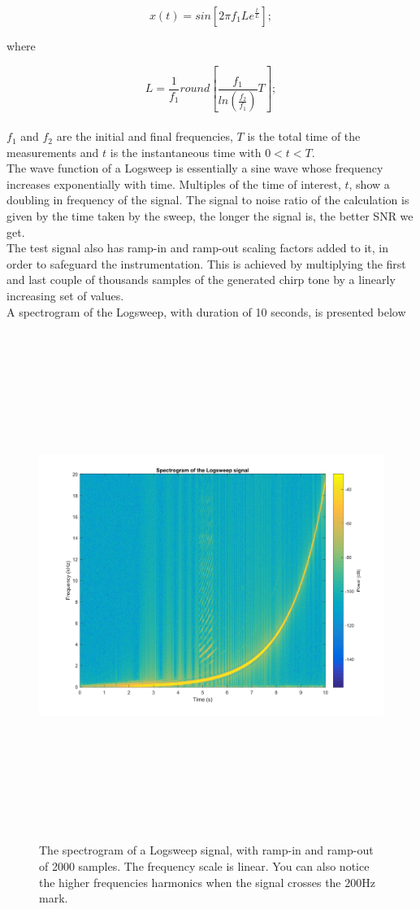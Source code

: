 \begin{equation}
x(t) = sin \left[ 2 \pi f_1 L e^{\frac{t}{L}} \right];
\label{eqn:logsweep}
\end{equation}

where

\[ L = \frac{1}{f_1} round \left[ \frac{f_1}{ln(\frac{f_2}{f_1})} T \right]; \]
\\
$f_1$ and $f_2$ are the initial and final frequencies, $T$ is the total time of the measurements and $t$ is the instantaneous time with $0<t<T$.
\\
The wave function of a Logsweep is essentially a sine wave whose frequency increases exponentially with time. Multiples of the time of interest, $t$, show a doubling in frequency of the signal. The signal to noise ratio of the calculation is given by the time taken by the sweep, the longer the signal is, the better SNR we get.
\\
The test signal also has ramp-in and ramp-out scaling factors added to it, in order to safeguard the instrumentation. This is achieved by multiplying the first and last couple of thousands samples of the generated chirp tone by a linearly increasing set of values.
\\
A spectrogram of the Logsweep, with duration of 10 seconds, is presented below

\begin{figure}[H]
\centering
\includegraphics[width=15cm,height=16.5cm,keepaspectratio]{Figures/spectrogramlogsweep}
\decoRule
\caption[Logsweep]{The spectrogram of a Logsweep signal, with ramp-in and ramp-out of 2000 samples. The frequency scale is linear. You can also notice the higher frequencies harmonics when the signal crosses the $200$Hz mark.}
\label{fig:logsweep}
\end{figure}

